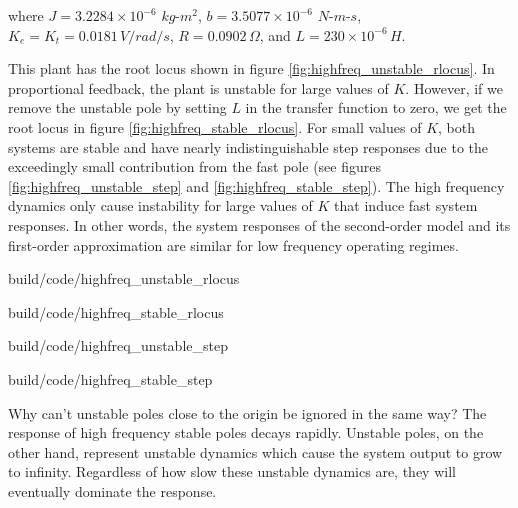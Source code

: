 where $J = 3.2284 \times 10^{-6}$ $kg$-$m^2$, $b = 3.5077 \times 10^{-6}$
$N$-$m$-$s$, $K_e = K_t = 0.0181 \,V/rad/s$, $R = 0.0902 \,\Omega$, and
$L = 230 \times 10^{-6} \,H$.

This \gls{plant} has the root locus shown in figure
\ref{fig:highfreq_unstable_rlocus}. In proportional feedback, the \gls{plant} is
unstable for large values of $K$. However, if we remove the unstable pole by
setting $L$ in the transfer function to zero, we get the root locus in figure
\ref{fig:highfreq_stable_rlocus}. For small values of $K$, both \glspl{system}
are stable and have nearly indistinguishable \glspl{step response} due to the
exceedingly small contribution from the fast pole (see figures
\ref{fig:highfreq_unstable_step} and \ref{fig:highfreq_stable_step}). The high
frequency dynamics only cause instability for large values of $K$ that induce
fast \glspl{system response}. In other words, the \glspl{system response} of the
second-order model and its first-order approximation are similar for low
frequency operating regimes.

\begin{bookfigure}
  \begin{minisvg}{build/code/highfreq_unstable_rlocus}
    \caption{Root locus of second-order DC brushed motor plant}
    \label{fig:highfreq_unstable_rlocus}
  \end{minisvg}
  \hfill
  \begin{minisvg}{build/code/highfreq_stable_rlocus}
    \caption{Root locus of first-order DC brushed motor plant}
    \label{fig:highfreq_stable_rlocus}
  \end{minisvg}
\end{bookfigure}

\begin{bookfigure}
  \begin{minisvg}{build/code/highfreq_unstable_step}
    \caption{Step response of second-order DC brushed motor plant}
    \label{fig:highfreq_unstable_step}
  \end{minisvg}
  \hfill
  \begin{minisvg}{build/code/highfreq_stable_step}
    \caption{Step response of first-order DC brushed motor plant}
    \label{fig:highfreq_stable_step}
  \end{minisvg}
\end{bookfigure}

Why can't unstable poles close to the origin be ignored in the same way? The
response of high frequency stable poles decays rapidly. Unstable poles, on the
other hand, represent unstable dynamics which cause the \gls{system}
\gls{output} to grow to infinity. Regardless of how slow these unstable dynamics
are, they will eventually dominate the response.
